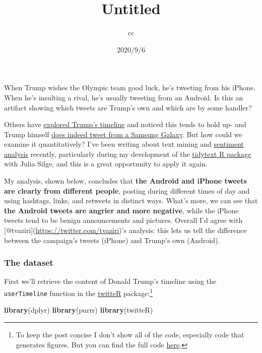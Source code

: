 \documentclass[
]{article}
\title{Untitled}
\author{cc}
\date{2020/9/6}
\newenvironment{Shaded}{\begin{snugshade}}{\end{snugshade}}
\newcommand{\KeywordTok}[1]{\textcolor[rgb]{0.13,0.29,0.53}{\textbf{#1}}}
\newcommand{\NormalTok}[1]{#1}
\begin{document}
\maketitle

When Trump wishes the Olympic team good luck, he's tweeting from his
iPhone. When he's insulting a rival, he's usually tweeting from an
Android. Is this an artifact showing which tweets are Trump's own and
which are by some handler?

Others have
\href{http://www.cnet.com/news/trumps-tweets-android-for-nasty-iphone-for-nice/}{explored
Trump's timeline} and noticed this tends to hold up- and Trump himself
\href{http://www.theverge.com/2015/10/5/9453935/donald-trump-twitter-strategy}{does
indeed tweet from a Samsung Galaxy}. But how could we examine it
quantitatively? I've been writing about text mining and
\href{http://varianceexplained.org/r/yelp-sentiment/}{sentiment
analysis} recently, particularly during my development of the
\href{http://github.com/juliasilge/tidytext}{tidytext R package} with
Julia Silge, and this is a great opportunity to apply it again.

My analysis, shown below, concludes that \textbf{the Android and iPhone
tweets are clearly from different people}, posting during different
times of day and using hashtags, links, and retweets in distinct ways.
What's more, we can see that \textbf{the Android tweets are angrier and
more negative}, while the iPhone tweets tend to be benign announcements
and pictures. Overall I'd agree with
{[}@tvaziri{]}(\url{https://twitter.com/tvaziri})'s analysis: this lets
us tell the difference between the campaign's tweets (iPhone) and
Trump's own (Android).

\hypertarget{the-dataset}{%
\subsubsection{The dataset}\label{the-dataset}}

First we'll retrieve the content of Donald Trump's timeline using the
\texttt{userTimeline} function in the
\href{https://cran.r-project.org/web/packages/twitteR}{twitteR}
package:\footnote{To keep the post concise I don't show all of the code,
  especially code that generates figures. But you can find the full code
  \href{https://github.com/dgrtwo/dgrtwo.github.com/blob/master/_R/2016-08-09-trump-tweets.Rmd}{here}.}

\begin{Shaded}
\begin{Highlighting}[]
\KeywordTok{library}\NormalTok{(dplyr)}
\KeywordTok{library}\NormalTok{(purrr)}
\KeywordTok{library}\NormalTok{(twitteR)}
\end{Highlighting}
\end{Shaded}
\end{document}
